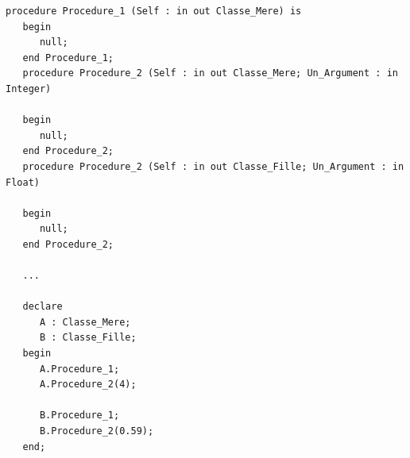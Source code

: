 \begin{lstlisting}[caption={POO en Ada - Implémentation}, label={poo-ada-imp}]   
   procedure Procedure_1 (Self : in out Classe_Mere) is
   begin
      null;
   end Procedure_1;
   procedure Procedure_2 (Self : in out Classe_Mere; Un_Argument : in Integer)

   begin
      null;
   end Procedure_2;
   procedure Procedure_2 (Self : in out Classe_Fille; Un_Argument : in Float)

   begin
      null;
   end Procedure_2;

   ...

   declare
      A : Classe_Mere;
      B : Classe_Fille;
   begin
      A.Procedure_1;
      A.Procedure_2(4);

      B.Procedure_1;
      B.Procedure_2(0.59);
   end;
\end{lstlisting}